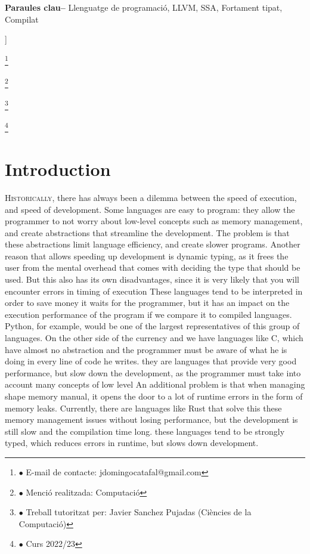 ﻿\documentclass[10pt,a4paper,twocolumn,twoside]{article}
\newcommand\blfootnote[1]{%
  \begingroup
  \renewcommand\thefootnote{}\footnote{#1}%
  \addtocounter{footnote}{-1}%
  \endgroup
}
\begin{document}
\begin{@twocolumnfalse}
\begin{center}
{    \bigskip

    \textbf{Paraules clau-- } Llenguatge de programació, LLVM, SSA, Fortament tipat, Compilat
}
\end{center}

\bigskip
\end{@twocolumnfalse}]

\blfootnote{$\bullet$ E-mail de contacte: jdomingocatafal@gmail.com}
\blfootnote{$\bullet$ Menció realitzada: Computació}
\blfootnote{$\bullet$ Treball tutoritzat per: Javier Sanchez Pujadas (Ciències de la Computació)}
\blfootnote{$\bullet$ Curs 2022/23}

\section{Introduction}
\lettrine[lines=3]{H}{istorically}, there has always been a dilemma between the
speed of execution, and speed of development. Some languages are easy to
program: they allow the programmer to not worry about low-level concepts such as
memory management, and create abstractions that streamline the development. The
problem is that these abstractions limit language efficiency, and create slower
programs. Another reason that allows speeding up development is dynamic typing,
as it frees the user from the mental overhead that comes with deciding the type
that should be used. But this also has its own disadvantages, since it is very
likely that you will encounter errors in timing of execution These languages
tend to be interpreted in order to save money it waits for the programmer, but
it has an impact on the execution performance of the program if we compare it to
compiled languages. Python, for example, would be one of the largest
representatives of this group of languages. On the other side of the currency
and we have languages like C, which have almost no abstraction and the
programmer must be aware of what he is doing in every line of code he writes.
they are languages that provide very good performance, but slow down the
development, as the programmer must take into account many concepts of low level
An additional problem is that when managing shape memory manual, it opens the
door to a lot of runtime errors in the form of memory leaks. Currently, there
are languages like Rust that solve this these memory management issues without
losing performance, but the development is still slow and the compilation time
long. these languages tend to be strongly typed, which reduces errors in
runtime, but slows down development.
\end{document}
